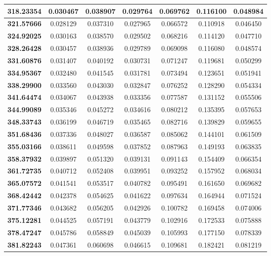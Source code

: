 \documentclass[11pt]{article}
\begin{document}
\begin{appendices}
\begin{longtable}{|c|c|c|c|c|c|c|}
	\textbf{318.23354} & 0.030467 & 0.038907 & 0.029764 & 0.069762 & 0.116100 & 0.048984 \\ \hline
	\textbf{321.57666} & 0.028129 & 0.037310 & 0.027965 & 0.066572 & 0.110918 & 0.046450 \\ \hline
	\textbf{324.92025} & 0.030163 & 0.038570 & 0.029502 & 0.068216 & 0.114120 & 0.047710 \\ \hline
	\textbf{328.26428} & 0.030457 & 0.038936 & 0.029789 & 0.069098 & 0.116080 & 0.048574 \\ \hline
	\textbf{331.60876} & 0.031407 & 0.040192 & 0.030731 & 0.071247 & 0.119681 & 0.050299 \\ \hline
	\textbf{334.95367} & 0.032480 & 0.041545 & 0.031781 & 0.073494 & 0.123651 & 0.051941 \\ \hline
	\textbf{338.29900} & 0.033560 & 0.043030 & 0.032847 & 0.076252 & 0.128290 & 0.054334 \\ \hline
	\textbf{341.64474} & 0.034067 & 0.043938 & 0.033356 & 0.077587 & 0.131152 & 0.055506 \\ \hline
	\textbf{344.99089} & 0.035346 & 0.045272 & 0.034616 & 0.080212 & 0.135395 & 0.057653 \\ \hline
	\textbf{348.33743} & 0.036199 & 0.046719 & 0.035465 & 0.082716 & 0.139829 & 0.059655 \\ \hline
	\textbf{351.68436} & 0.037336 & 0.048027 & 0.036587 & 0.085062 & 0.144101 & 0.061509 \\ \hline
	\textbf{355.03166} & 0.038611 & 0.049598 & 0.037852 & 0.087963 & 0.149193 & 0.063835 \\ \hline
	\textbf{358.37932} & 0.039897 & 0.051320 & 0.039131 & 0.091143 & 0.154409 & 0.066354 \\ \hline
	\textbf{361.72735} & 0.040712 & 0.052408 & 0.039951 & 0.093252 & 0.157952 & 0.068034 \\ \hline
	\textbf{365.07572} & 0.041541 & 0.053517 & 0.040782 & 0.095491 & 0.161650 & 0.069682 \\ \hline
	\textbf{368.42442} & 0.042378 & 0.054625 & 0.041622 & 0.097634 & 0.164944 & 0.071524 \\ \hline
	\textbf{371.77346} & 0.043682 & 0.056205 & 0.042926 & 0.100782 & 0.169458 & 0.074006 \\ \hline
	\textbf{375.12281} & 0.044525 & 0.057191 & 0.043779 & 0.102916 & 0.172533 & 0.075888 \\ \hline
	\textbf{378.47247} & 0.045786 & 0.058849 & 0.045039 & 0.105993 & 0.177150 & 0.078339 \\ \hline
	\textbf{381.82243} & 0.047361 & 0.060698 & 0.046615 & 0.109681 & 0.182421 & 0.081219 \\ \hline

\end{longtable}
\end{appendices}
\end{document}
